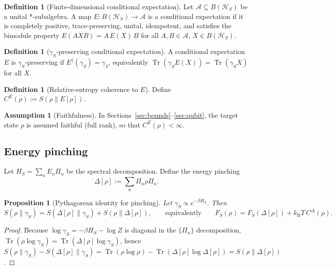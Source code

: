 \documentclass[11pt,a4paper]{article}
\theoremstyle{plain}
\newtheorem{proposition}[theorem]{Proposition}
\theoremstyle{definition}
\newtheorem{definition}[theorem]{Definition}
\newtheorem{assumption}[theorem]{Assumption}
\theoremstyle{remark}
\newcommand{\Tr}{\operatorname{Tr}}
\newcommand{\kB}{k_{\mathrm{B}}}
\begin{document}
\begin{definition}[Finite-dimensional conditional expectation]
Let $\mathcal{A} \subseteq B(\mathcal{H}_S)$ be a unital *-subalgebra. A map
$E: B(\mathcal{H}_S) \to \mathcal{A}$ is a conditional expectation if it is
completely positive, trace-preserving, unital, idempotent, and satisfies the
bimodule property $E(AXB) = A\,E(X)\,B$ for all $A, B \in \mathcal{A}$,
$X \in B(\mathcal{H}_S)$.
\end{definition}

\begin{definition}[$\gamma_S$-preserving conditional expectation]
A conditional expectation $E$ is $\gamma_S$-preserving if
$E^\dagger(\gamma_S) = \gamma_S$, equivalently
$\Tr(\gamma_S E(X)) = \Tr(\gamma_S X)$ for all $X$.
\end{definition}

\begin{definition}[Relative-entropy coherence to $E$]
Define $C^E(\rho) := S(\rho\|E[\rho])$.
\end{definition}

\begin{assumption}[Faithfulness]\label{ass:faithful}
In Sections~\ref{sec:bounds}--\ref{sec:qubit}, the target state $\rho$ is
assumed faithful (full rank), so that $C^E(\rho) < \infty$.
\end{assumption}

\subsection{Energy pinching}

Let $H_S = \sum_n E_n \Pi_n$ be the spectral decomposition. Define the energy
pinching
\begin{equation}
\Delta[\rho] := \sum_n \Pi_n \rho \Pi_n.
\end{equation}

\begin{proposition}[Pythagorean identity for pinching]\label{prop:pythagoras}
Let $\gamma_S \propto e^{-\beta H_S}$. Then
\begin{equation}
S(\rho\|\gamma_S) = S(\Delta[\rho]\|\gamma_S) + S(\rho\|\Delta[\rho]),
\qquad\text{equivalently}\qquad
F_S(\rho) = F_S(\Delta[\rho]) + \kB T\, C^\Delta(\rho).
\end{equation}
\end{proposition}

\begin{proof}
Because $\log\gamma_S = -\beta H_S - \log Z$ is diagonal in the $\{\Pi_n\}$
decomposition, $\Tr(\rho\log\gamma_S) = \Tr(\Delta[\rho]\log\gamma_S)$, hence
$S(\rho\|\gamma_S) - S(\Delta[\rho]\|\gamma_S) = \Tr(\rho\log\rho) -
\Tr(\Delta[\rho]\log\Delta[\rho]) = S(\rho\|\Delta[\rho])$.
\end{proof}
\end{document}
